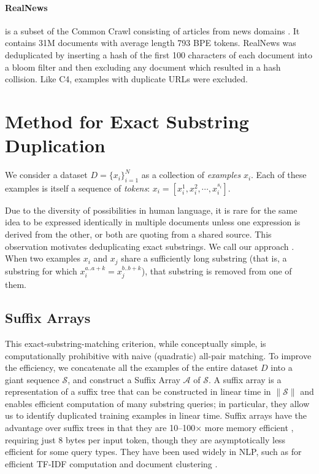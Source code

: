 \paragraph{RealNews}
is a subset of the Common Crawl consisting of articles from news domains \citep{zellers2019defending}.
It contains 31M documents with average length 793 BPE tokens.
RealNews was deduplicated by inserting a hash of the first 100 characters of each document into a bloom filter \citep{bloom1970space} and then excluding any document which resulted in a hash collision.
Like C4, examples with duplicate URLs were excluded.


\section{Method for Exact Substring Duplication} \label{sec:exact}
We consider a dataset $D = \{x_i\}_{i=1}^N$ as a collection of \emph{examples} $x_i$.
Each of these examples is itself a sequence of \emph{tokens}: $x_i = \left[ x_i^1, x_i^2, \cdots, x_i^{s_i} \right]$.

Due to the diversity of possibilities in human language, it is rare for the same idea to be expressed identically in multiple documents unless one expression is derived from the other, or both are quoting from a shared source.
This observation motivates deduplicating exact substrings. We call our approach \Exact{}.
When two examples $x_i$ and $x_j$ share a sufficiently long substring (that is, a substring for which $x_i^{a..a+k} = x_j^{b..b+k}$), that substring is removed from one of them.

\subsection{Suffix Arrays}
This exact-substring-matching criterion, while conceptually simple, is computationally prohibitive with naive (quadratic) all-pair matching.
%
To improve the efficiency, we concatenate all the examples of the entire dataset $D$ into a giant sequence $\mathcal{S}$, and construct a Suffix Array $\mathcal{A}$ of $\mathcal{S}$.
A suffix array \citep{manber1993suffix} is a representation of a suffix tree \citep{weiner1973linear} that can be constructed in linear time in $\lVert \mathcal{S} \rVert$ \citep{karkkainen2003simple}  
and enables efficient computation of many substring queries; in particular, they allow us to identify duplicated training examples in linear time.
Suffix arrays have the advantage over suffix trees in that they are 10--100$\times$
more memory efficient \cite{manber1993suffix}, requiring just 8 bytes per input token, though they are asymptotically less
efficient for some query types.
They have been used widely in NLP, such as for efficient TF-IDF computation \citep{yamamoto2001using} and document clustering \citep{hung2007new}.


